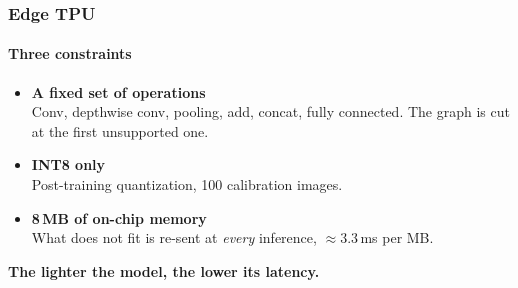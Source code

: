 
\begin{frame}
\frametitle{Edge TPU}
\framesubtitle{Three constraints}

\vspace{0.3cm}

\begin{itemize}\setlength{\itemsep}{14pt}
  \item[{\color{blue!80!black}$\bullet$}]
    \textbf{A fixed set of operations}\\
    {\small Conv, depthwise conv, pooling, add, concat, fully connected.
     The graph is cut at the first unsupported one.}
  \item[{\color{blue!80!black}$\bullet$}]
    \textbf{INT8 only}\\
    {\small Post-training quantization, 100 calibration images.}
  \item[{\color{blue!80!black}$\bullet$}]
    \textbf{8\,MB of on-chip memory}\\
    {\small What does not fit is re-sent at \emph{every} inference,
     $\approx 3.3$\,ms per MB.}
\end{itemize}

\vspace{0.5cm}
\begin{center}
{\color{blue!80!black}\textbf{The lighter the model, the lower its latency.}}
\end{center}

\end{frame}
